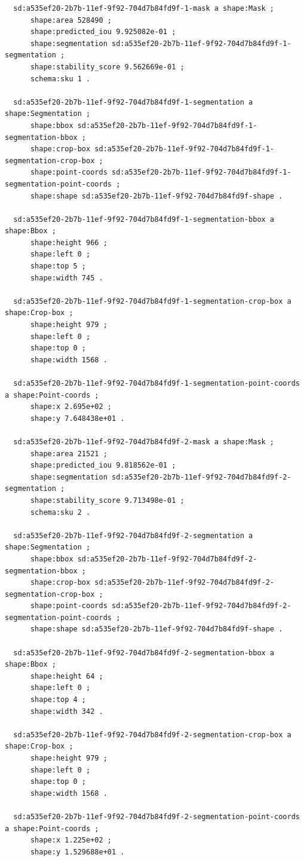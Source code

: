 \documentclass[732,14pt,final]{studrep}
\begin{document}
\begin{verbatim}
  sd:a535ef20-2b7b-11ef-9f92-704d7b84fd9f-1-mask a shape:Mask ;
      shape:area 528490 ;
      shape:predicted_iou 9.925082e-01 ;
      shape:segmentation sd:a535ef20-2b7b-11ef-9f92-704d7b84fd9f-1-segmentation ;
      shape:stability_score 9.562669e-01 ;
      schema:sku 1 .
  
  sd:a535ef20-2b7b-11ef-9f92-704d7b84fd9f-1-segmentation a shape:Segmentation ;
      shape:bbox sd:a535ef20-2b7b-11ef-9f92-704d7b84fd9f-1-segmentation-bbox ;
      shape:crop-box sd:a535ef20-2b7b-11ef-9f92-704d7b84fd9f-1-segmentation-crop-box ;
      shape:point-coords sd:a535ef20-2b7b-11ef-9f92-704d7b84fd9f-1-segmentation-point-coords ;
      shape:shape sd:a535ef20-2b7b-11ef-9f92-704d7b84fd9f-shape .
  
  sd:a535ef20-2b7b-11ef-9f92-704d7b84fd9f-1-segmentation-bbox a shape:Bbox ;
      shape:height 966 ;
      shape:left 0 ;
      shape:top 5 ;
      shape:width 745 .
  
  sd:a535ef20-2b7b-11ef-9f92-704d7b84fd9f-1-segmentation-crop-box a shape:Crop-box ;
      shape:height 979 ;
      shape:left 0 ;
      shape:top 0 ;
      shape:width 1568 .
  
  sd:a535ef20-2b7b-11ef-9f92-704d7b84fd9f-1-segmentation-point-coords a shape:Point-coords ;
      shape:x 2.695e+02 ;
      shape:y 7.648438e+01 .
  
  sd:a535ef20-2b7b-11ef-9f92-704d7b84fd9f-2-mask a shape:Mask ;
      shape:area 21521 ;
      shape:predicted_iou 9.818562e-01 ;
      shape:segmentation sd:a535ef20-2b7b-11ef-9f92-704d7b84fd9f-2-segmentation ;
      shape:stability_score 9.713498e-01 ;
      schema:sku 2 .
  
  sd:a535ef20-2b7b-11ef-9f92-704d7b84fd9f-2-segmentation a shape:Segmentation ;
      shape:bbox sd:a535ef20-2b7b-11ef-9f92-704d7b84fd9f-2-segmentation-bbox ;
      shape:crop-box sd:a535ef20-2b7b-11ef-9f92-704d7b84fd9f-2-segmentation-crop-box ;
      shape:point-coords sd:a535ef20-2b7b-11ef-9f92-704d7b84fd9f-2-segmentation-point-coords ;
      shape:shape sd:a535ef20-2b7b-11ef-9f92-704d7b84fd9f-shape .
  
  sd:a535ef20-2b7b-11ef-9f92-704d7b84fd9f-2-segmentation-bbox a shape:Bbox ;
      shape:height 64 ;
      shape:left 0 ;
      shape:top 4 ;
      shape:width 342 .
  
  sd:a535ef20-2b7b-11ef-9f92-704d7b84fd9f-2-segmentation-crop-box a shape:Crop-box ;
      shape:height 979 ;
      shape:left 0 ;
      shape:top 0 ;
      shape:width 1568 .
  
  sd:a535ef20-2b7b-11ef-9f92-704d7b84fd9f-2-segmentation-point-coords a shape:Point-coords ;
      shape:x 1.225e+02 ;
      shape:y 1.529688e+01 .
  

\end{verbatim}
\end{document}
